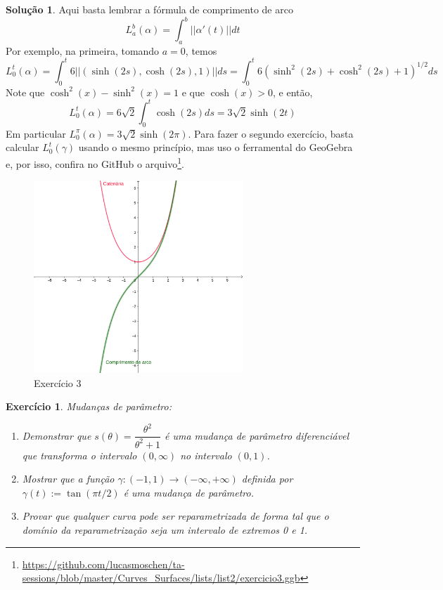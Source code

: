 \documentclass[a4paper,12pt]{article}
\theoremstyle{exer}
\newtheorem{exercise}{Exercício}
\theoremstyle{definition}
\newtheorem{solution}{Solução}
\theoremstyle{plain}
\begin{document}
\begin{solution}
    Aqui basta lembrar a fórmula de comprimento de arco 
    $$
    L_a^b(\alpha) = \int_a^b ||\alpha '(t)||dt
    $$
    Por exemplo, na primeira, tomando $a = 0$, temos 
    $$
    L_0^t(\alpha) = \int_0^t 6||(\sinh(2s), \cosh(2s), 1)||ds = \int_0^t 6(\sinh^2(2s) + \cosh^2(2s) + 1)^{1/2}ds
    $$
    Note que $\cosh^2(x) - \sinh^2(x) = 1$ e que $\cosh(x) > 0$, e então, 
    $$
    L_0^t(\alpha) = 6\sqrt{2}\int_0^t \cosh(2s)ds = 3\sqrt{2}\sinh(2t)
    $$
    Em particular $L_0^{\pi}(\alpha) = 3\sqrt{2}\sinh(2\pi)$. Para fazer o
    segundo exercício, basta calcular $L_0^t(\gamma)$ usando o mesmo
    princípio, mas uso o ferramental do GeoGebra e, por isso, confira no
    GitHub o
    arquivo\footnote{\url{https://github.com/lucasmoschen/ta-sessions/blob/master/Curves_Surfaces/lists/list2/exercicio3.ggb}}.
    \begin{figure}[ht]
        \centering
        \includegraphics[width=0.7\textwidth]{images/exe3.png}
        \caption{Exercício 3}
        \label{fig2}
    \end{figure}
\end{solution}

\begin{exercise}
    Mudanças de parâmetro:
    \begin{enumerate}
        \item  Demonstrar que $s(\theta) = \dfrac{\theta^2}{\theta^2 + 1}$ é uma mudança de parâmetro diferenciável que
        transforma o intervalo $(0,\infty)$ no intervalo $(0, 1)$.
        \item Mostrar que a função $\gamma : (-1, 1) \to (-\infty, +\infty)$
        definida por $\gamma(t) := \tan(\pi t/2)$ é uma mudança de parâmetro.
        \item Provar que qualquer curva pode ser reparametrizada de forma tal que o domínio
        da reparametrização seja um intervalo de extremos 0 e 1.
    \end{enumerate}
\end{exercise}
\end{document}

